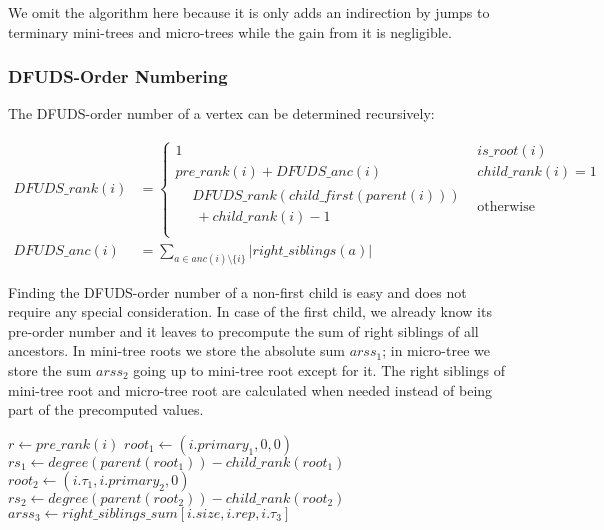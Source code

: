 We omit the algorithm here because it is only adds an indirection by jumps to terminary mini-trees and micro-trees while the gain from it is negligible.

\subsubsection{DFUDS-Order Numbering}

The DFUDS-order number of a vertex can be determined recursively:

\begin{align*}
DFUDS\_rank(i) &=
\begin{cases}
	1 & is\_root(i) \\
	pre\_rank(i) + DFUDS\_anc(i)  & child\_rank(i) = 1 \\
	\begin{aligned}
		&DFUDS\_rank(child\_first(parent(i))) \\
		&\ + child\_rank(i) - 1
	\end{aligned} & \textrm{otherwise} \\
\end{cases} \\
DFUDS\_anc(i) &= \sum_{a \in anc(i) \setminus \{i\}} |right\_siblings(a)|
\end{align*}


Finding the DFUDS-order number of a non-first child is easy and does not require any special consideration.
In case of the first child, we already know its pre-order number and it leaves to precompute the sum of right siblings of all ancestors.
In mini-tree roots we store the absolute sum $arss_1$; in micro-tree we store the sum $arss_2$ going up to mini-tree root except for it.
The right siblings of mini-tree root and micro-tree root are calculated when needed instead of being part of the precomputed values.

\begin{algorithmic}
		\State {}
		\State {}
	\Else
		\State $r \gets pre\_rank(i)$
		\State $root_1 \gets (i.primary_1, 0, 0)$ 
		\State $rs_1 \gets degree(parent(root_1)) - child\_rank(root_1)$ 
			\State $root_2 \gets (i.\tau_1, i.primary_2, 0)$ 
			\State $rs_2 \gets degree(parent(root_2)) - child\_rank(root_2)$
			\State $arss_3 \gets right\_siblings\_sum[i.size, i.rep, i.\tau_3]$
			\State {}
			\State {}
		\Else
			\State {}
		\EndIf
	\EndIf
\EndFunction
\end{algorithmic}

